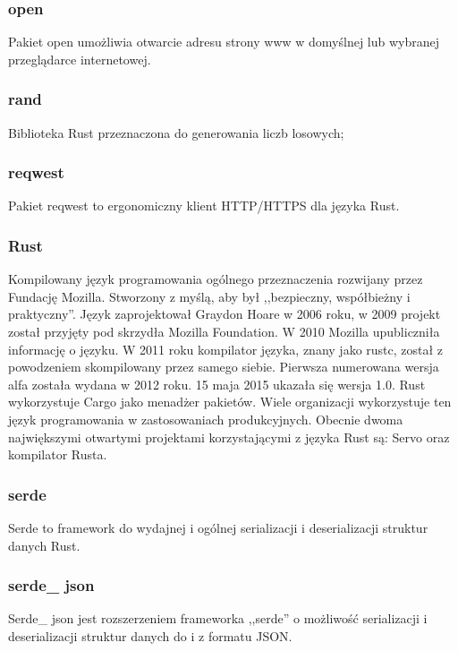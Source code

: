 \documentclass[12pt,a4paper]{article}
\begin{document}
				\subsubsection{open}
					
					\indent Pakiet open umożliwia otwarcie adresu strony www w domyślnej lub wybranej przeglądarce internetowej.
				\subsubsection{rand}

					\indent Biblioteka Rust przeznaczona do generowania liczb losowych;
				\subsubsection{reqwest}

					\indent Pakiet reqwest to ergonomiczny klient HTTP/HTTPS dla języka Rust.
				\subsubsection{Rust}

					\indent Kompilowany język programowania ogólnego przeznaczenia rozwijany przez Fundację Mozilla. Stworzony z myślą, aby był ,,bezpieczny, współbieżny i praktyczny''.
					Język zaprojektował Graydon Hoare w 2006 roku, w 2009 projekt został przyjęty pod skrzydła Mozilla Foundation. W 2010 Mozilla upubliczniła informację o języku.
					W 2011 roku kompilator języka, znany jako rustc, został z powodzeniem skompilowany przez samego siebie. Pierwsza numerowana wersja alfa została wydana w 2012 roku.
					15 maja 2015 ukazała się wersja 1.0. Rust wykorzystuje Cargo jako menadżer pakietów. Wiele organizacji wykorzystuje ten język programowania w zastosowaniach
					produkcyjnych. Obecnie dwoma największymi otwartymi projektami korzystającymi z języka Rust są: Servo oraz kompilator Rusta. 
				\subsubsection{serde}

					\indent Serde to framework do wydajnej i ogólnej serializacji i deserializacji struktur danych Rust.
				\subsubsection{serde\_ json}

					\indent Serde\_ json jest rozszerzeniem frameworka ,,serde'' o możliwość serializacji i deserializacji struktur danych do i z formatu JSON.
\end{document}
